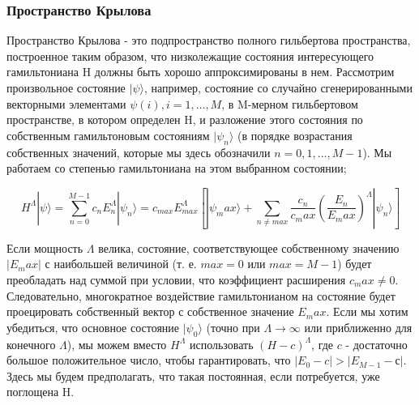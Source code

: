 \documentclass[11pt]{article}
\begin{document}
\subsubsection{Пространство Крылова}
Пространство Крылова - это подпространство полного гильбертова пространства, построенное таким образом, что низколежащие состояния интересующего гамильтониана H должны быть хорошо аппроксимированы в нем. Рассмотрим произвольное состояние 
$|\psi \rangle$, например, состояние со случайно сгенерированными векторными элементами $\psi(i), i = 1,\dots, M$, в M-мерном гильбертовом пространстве, в котором определен H, и разложение этого состояния по собственным гамильтоновым состояниям $|\psi_n \rangle$ (в порядке возрастания собственных значений, которые мы здесь обозначили $n = 0, 1, \dots , M - 1$). Мы работаем со степенью гамильтониана на этом выбранном состоянии;

\begin{equation}
H^{\Lambda}|\psi \rangle = \sum_{n=0}^{M-1}c_nE_n^{\Lambda}|\psi_n\rangle = c_{max}E_{max}^{\Lambda}[|\psi_max \rangle + \sum\limits_{n \ne max} \frac{c_n}{c_max}(\frac{E_n}{E_max})^{\Lambda}|\psi_n\rangle]
\label{eq_170}
\end{equation}

Если мощность $\Lambda$ велика, состояние, соответствующее собственному значению $| E_ max |$ с наибольшей величиной (т. е. $max = 0$ или $max = M - 1$) будет преобладать над суммой при условии, что коэффициент расширения $c_max \ne 0$. Следовательно, многократное воздействие гамильтонианом на состояние будет проецировать собственный вектор с собственное значение $E_max$. 
Если мы хотим убедиться, что основное состояние $|\psi_0 \rangle$ (точно при $\Lambda \to \infty$ или приближенно для конечного $\Lambda$), мы можем вместо $H^{\Lambda}$ использовать $(H-c)^\Lambda$, где $c$ - достаточно большое положительное число, чтобы гарантировать, что $| E_0 - c | > | E_{M − 1} - с |$. Здесь мы будем предполагать, что такая постоянная, если потребуется, уже поглощена H.
\end{document}
